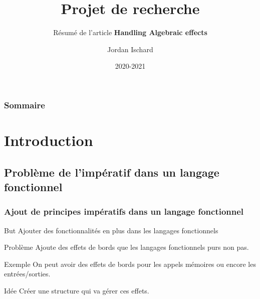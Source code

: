 \documentclass{beamer}
\title{Projet de recherche}
\subtitle{Résumé de l'article \textbf{Handling Algebraic effects}}
\author{Jordan Ischard}
\institute{Université d'Orléans}
\date{2020-2021}
\begin{document}

\AtBeginSubsection
{
  \begin{frame} 
	\frametitle{Sommaire}
	\tableofcontents[sectionstyle=show/shaded/hide,subsectionstyle=show/shaded/hide]
  \end{frame}
}



\frame{\titlepage}

\section{Introduction}

\subsection{Problème de l'impératif dans un langage fonctionnel}
\begin{frame}
\frametitle{Ajout de principes impératifs dans un langage fonctionnel}

	\begin{block}{But}
		Ajouter des fonctionnalités en plus dans les langages fonctionnels
	\end{block}

	\begin{alertblock}{Problème}
		Ajoute des effets de bords que les langages fonctionnels purs non pas.
	\end{alertblock}

	\begin{exampleblock}{Exemple}
		On peut avoir des effets de bords pour les appels mémoires ou encore
		les entrées/sorties.
	\end{exampleblock}

	\begin{block}{Idée}
		Créer une structure qui va gérer ces effets.
	\end{block}
\end{frame}
\end{document}
